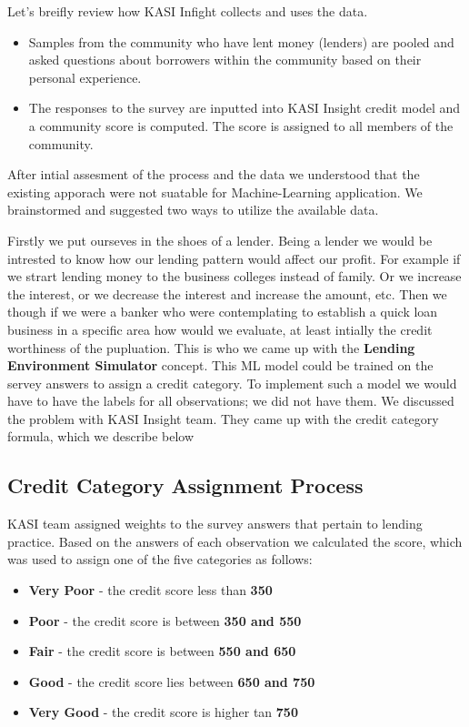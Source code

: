 Let's breifly review how KASI Infight collects and uses the data.

\begin{itemize}
\item
  Samples from the community who have lent money (lenders) are pooled
  and asked questions about borrowers within the community based on
  their personal experience.
\item
  The responses to the survey are inputted into KASI Insight credit
  model and a community score is computed. The score is assigned to all
  members of the community.
\end{itemize}

After intial assesment of the process and the data we understood that
the existing apporach were not suatable for Machine-Learning
application. We brainstormed and suggested two ways to utilize the
available data.

Firstly we put ourseves in the shoes of a lender. Being a lender we
would be intrested to know how our lending pattern would affect our
profit. For example if we strart lending money to the business colleges
instead of family. Or we increase the interest, or we decrease the
interest and increase the amount, etc. Then we though if we were a
banker who were contemplating to establish a quick loan business in a
specific area how would we evaluate, at least intially the credit
worthiness of the pupluation. This is who we came up with the
\textbf{Lending Environment Simulator} concept. This ML model could be
trained on the servey answers to assign a credit category. To implement
such a model we would have to have the labels for all observations; we
did not have them. We discussed the problem with KASI Insight team. They
came up with the credit category formula, which we describe below

\hypertarget{credit-category-assignment-process}{%
\subsection{Credit Category Assignment
Process}\label{credit-category-assignment-process}}

KASI team assigned weights to the survey answers that pertain to lending
practice. Based on the answers of each observation we calculated the
score, which was used to assign one of the five categories as follows:

\begin{itemize}
\tightlist
\item
  \textbf{Very Poor} - the credit score less than \textbf{350}
\item
  \textbf{Poor} - the credit score is between \textbf{350 and 550}
\item
  \textbf{Fair} - the credit score is between \textbf{550 and 650}
\item
  \textbf{Good} - the credit score lies between \textbf{650 and 750}
\item
  \textbf{Very Good} - the credit score is higher tan \textbf{750}
\end{itemize}

